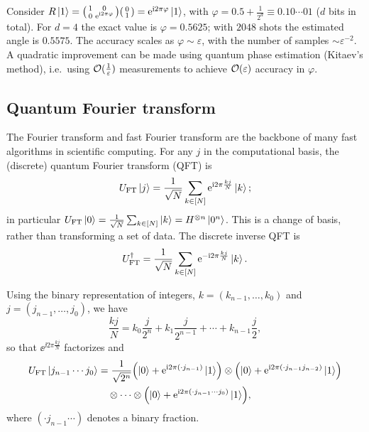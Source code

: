\begin{example}
Consider $R\ket{1} = \begin{psmallmatrix} 1 & 0 \\ 0 & \mathrm{e}^{\mathrm{i} 2\pi\varphi} \end{psmallmatrix}\begin{psmallmatrix} 0 \\ 1 \end{psmallmatrix} = \mathrm{e}^{\mathrm{i} 2\pi\varphi}\ket{1}$,
with $\varphi = 0.5 + \tfrac{1}{2^d} \equiv 0.10\cdots01$ ($d$ bits in total). For
$d = 4$ the exact value is $\varphi = 0.5625$; with $2048$ shots the estimated
angle is $0.5575$. The accuracy scales as $\varphi \sim \varepsilon$, with the
number of samples $\sim \varepsilon^{-2}$. A quadratic improvement can be made
using quantum phase estimation (Kitaev's method), i.e.\ using
$\mathcal{O}(\tfrac{1}{\varepsilon})$ measurements to achieve $\mathcal{O}(\varepsilon)$
accuracy in $\varphi$.
\end{example}

\subsection{Quantum Fourier transform}\label{sec:sec02-qft}

The Fourier transform and fast Fourier transform are the backbone of many fast
algorithms in scientific computing. For any $j$ in the computational basis, the
(discrete) quantum Fourier transform (QFT) is
\begin{equation}
  U_{\mathrm{FT}}\ket{j} = \frac{1}{\sqrt{N}}\sum_{k \in [N]} \mathrm{e}^{\mathrm{i} 2\pi \frac{kj}{N}}\ket{k};
\end{equation}
in particular $U_{\mathrm{FT}}\ket{0} = \tfrac{1}{\sqrt{N}}\sum_{k \in [N]}\ket{k}
= H^{\otimes n}\ket{0^n}$. This is a change of basis, rather than transforming a
set of data. The discrete inverse QFT is
\begin{equation}
  U_{\mathrm{FT}}^{\dagger} = \frac{1}{\sqrt{N}}\sum_{k \in [N]} \mathrm{e}^{-\mathrm{i} 2\pi \frac{kj}{N}}\ket{k}.
\end{equation}

Using the binary representation of integers, $k = (k_{n-1}, \dots, k_0)$ and
$j = (j_{n-1}, \dots, j_0)$, we have
\begin{equation}
  \frac{kj}{N} = k_0\frac{j}{2^n} + k_1\frac{j}{2^{n-1}} + \cdots + k_{n-1}\frac{j}{2},
\end{equation}
so that $\ee^{\ii 2\pi \frac{kj}{N}}$ factorizes and
\begin{align}
  U_{\mathrm{FT}}\ket{j_{n-1}\cdots j_0}
  &= \frac{1}{\sqrt{2^n}}\Bigl(\ket{0} + \mathrm{e}^{\mathrm{i} 2\pi (\cdot j_{n-1})}\ket{1}\Bigr)
     \otimes \Bigl(\ket{0} + \mathrm{e}^{\mathrm{i} 2\pi (\cdot j_{n-1} j_{n-2})}\ket{1}\Bigr) \notag\\
  &\quad \otimes \cdots \otimes \Bigl(\ket{0} + \mathrm{e}^{\mathrm{i} 2\pi (\cdot j_{n-1}\cdots j_0)}\ket{1}\Bigr),
\end{align}
where $(\cdot j_{n-1}\cdots)$ denotes a binary fraction.

